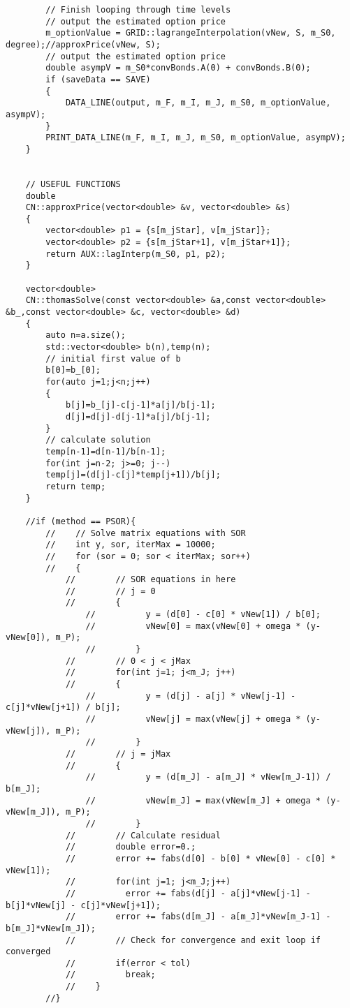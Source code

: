 \begin{lstlisting}
		// Finish looping through time levels
		// output the estimated option price
		m_optionValue = GRID::lagrangeInterpolation(vNew, S, m_S0, degree);//approxPrice(vNew, S);
		// output the estimated option price
		double asympV = m_S0*convBonds.A(0) + convBonds.B(0);
		if (saveData == SAVE)
		{
			DATA_LINE(output, m_F, m_I, m_J, m_S0, m_optionValue, asympV);
		}
		PRINT_DATA_LINE(m_F, m_I, m_J, m_S0, m_optionValue, asympV);
	}
	
	
	// USEFUL FUNCTIONS
	double
	CN::approxPrice(vector<double> &v, vector<double> &s)
	{
		vector<double> p1 = {s[m_jStar], v[m_jStar]};
		vector<double> p2 = {s[m_jStar+1], v[m_jStar+1]};
		return AUX::lagInterp(m_S0, p1, p2);
	}
	
	vector<double>
	CN::thomasSolve(const vector<double> &a,const vector<double> &b_,const vector<double> &c, vector<double> &d)
	{
		auto n=a.size();
		std::vector<double> b(n),temp(n);
		// initial first value of b
		b[0]=b_[0];
		for(auto j=1;j<n;j++)
		{
			b[j]=b_[j]-c[j-1]*a[j]/b[j-1];
			d[j]=d[j]-d[j-1]*a[j]/b[j-1];
		}
		// calculate solution
		temp[n-1]=d[n-1]/b[n-1];
		for(int j=n-2; j>=0; j--)
		temp[j]=(d[j]-c[j]*temp[j+1])/b[j];
		return temp;
	}
	
	//if (method == PSOR){
		//    // Solve matrix equations with SOR
		//    int y, sor, iterMax = 10000;
		//    for (sor = 0; sor < iterMax; sor++)
		//    {
			//        // SOR equations in here
			//        // j = 0
			//        {
				//          y = (d[0] - c[0] * vNew[1]) / b[0];
				//          vNew[0] = max(vNew[0] + omega * (y-vNew[0]), m_P);
				//        }
			//        // 0 < j < jMax
			//        for(int j=1; j<m_J; j++)
			//        {
				//          y = (d[j] - a[j] * vNew[j-1] - c[j]*vNew[j+1]) / b[j];
				//          vNew[j] = max(vNew[j] + omega * (y-vNew[j]), m_P);
				//        }
			//        // j = jMax
			//        {
				//          y = (d[m_J] - a[m_J] * vNew[m_J-1]) / b[m_J];
				//          vNew[m_J] = max(vNew[m_J] + omega * (y-vNew[m_J]), m_P);
				//        }
			//        // Calculate residual
			//        double error=0.;
			//        error += fabs(d[0] - b[0] * vNew[0] - c[0] * vNew[1]);
			//        for(int j=1; j<m_J;j++)
			//          error += fabs(d[j] - a[j]*vNew[j-1] - b[j]*vNew[j] - c[j]*vNew[j+1]);
			//        error += fabs(d[m_J] - a[m_J]*vNew[m_J-1] - b[m_J]*vNew[m_J]);
			//        // Check for convergence and exit loop if converged
			//        if(error < tol)
			//          break;
			//    }
		//}
\end{lstlisting}


